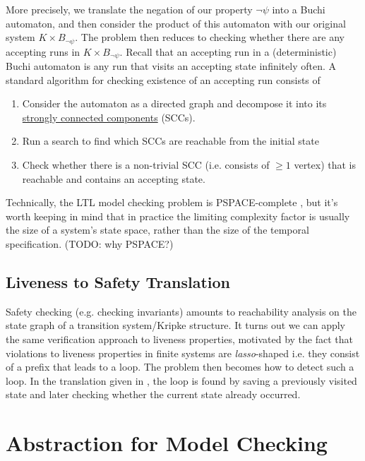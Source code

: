 \documentclass[10pt,a4paper]{article}
\begin{document}
More precisely, we translate the negation of our property $\neg \psi$ into a Buchi automaton, and then consider the product of this automaton with our original system $K \times B_{\neg \psi}$. The problem then reduces to checking whether there are any accepting runs in $K \times B_{\neg \psi}$. Recall that an accepting run in a (deterministic) Buchi automaton is any run that visits an accepting state infinitely often. A standard algorithm for checking existence of an accepting run consists of
\begin{enumerate}
    \item Consider the automaton as a directed graph and decompose it into its \href{https://will62794.github.io/my-notes/notes/Strongly_Connected_Components/Strongly_Connected_Components.html}{strongly connected components} (SCCs).
    \item Run a search to find which SCCs are reachable from the initial state
    \item Check whether there is a non-trivial SCC (i.e. consists of $\geq 1$ vertex) that is reachable and contains an accepting state.
\end{enumerate}

Technically, the LTL model checking problem is PSPACE-complete \cite{1985sistlaclarke}, but it's worth keeping in mind that in practice the limiting complexity factor is usually the size of a system's state space, rather than the size of the temporal specification. (TODO: why PSPACE?)

\subsection*{Liveness to Safety Translation}

Safety checking (e.g. checking invariants) amounts to reachability analysis on the state graph of a transition system/Kripke structure. It turns out we can apply the same verification approach to liveness properties, motivated by the fact that violations to liveness properties in finite systems are \textit{lasso}-shaped i.e. they consist of a prefix that leads to a loop. The problem then becomes how to detect such a loop. In the translation given in \cite{2002bierelivenessassafety}, the loop is found by saving a previously visited state and later checking whether the current state already occurred.


\section{Abstraction for Model Checking}
\end{document}

